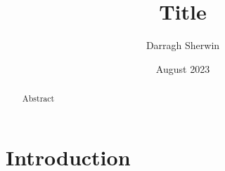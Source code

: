 \documentclass[12pt, a4paper]{article}
\title{Title}
\author{Darragh Sherwin}
\date{August 2023}
\begin{document}
\maketitle
\begin{abstract}
Abstract

\end{abstract}

\section{Introduction}



\printbibliography
\end{document}
